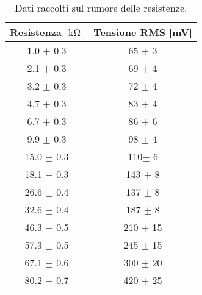 \begin{table}
	\centering
	\begin{tabular}{c c}
		\toprule
		Resistenza [$\si{\kilo\ohm}$] & Tensione RMS [\si{\milli\volt}]\\
		\midrule
		1.0 $\pm$ 0.3 & 65 $\pm$ 3\\
		2.1 $\pm$ 0.3 & 69 $\pm$ 4\\
		3.2 $\pm$ 0.3 & 72 $\pm$ 4\\
		4.7 $\pm$ 0.3 & 83 $\pm$ 4\\
		6.7 $\pm$ 0.3 & 86 $\pm$ 6\\
		9.9 $\pm$ 0.3 & 98 $\pm$ 4\\
		15.0 $\pm$ 0.3 & 110$\pm$ 6\\
		18.1 $\pm$ 0.3 & 143 $\pm$ 8\\
		26.6 $\pm$ 0.4 & 137 $\pm$ 8\\
		32.6 $\pm$ 0.4 & 187 $\pm$ 8\\
		46.3 $\pm$ 0.5 & 210 $\pm$ 15\\
		57.3 $\pm$ 0.5 & 245 $\pm$ 15\\
		67.1 $\pm$ 0.6 & 300 $\pm$ 20\\
		80.2 $\pm$ 0.7 & 420 $\pm$ 25\\
		\bottomrule
	\end{tabular}
	\caption{Dati raccolti sul rumore delle resistenze.}
	\label{tab:data}
\end{table}
